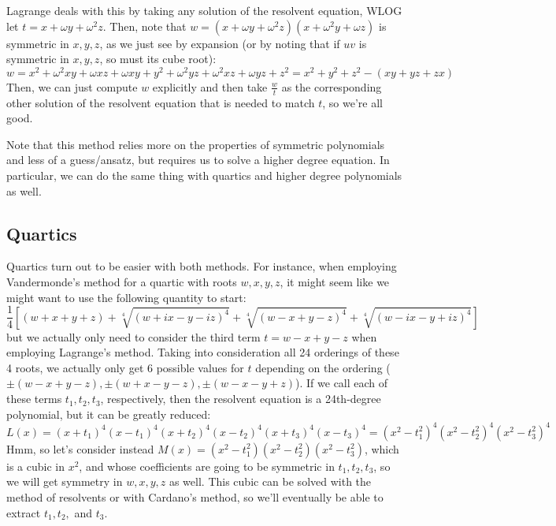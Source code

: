 \documentclass[12pt]{scrartcl}
\begin{document}
Lagrange deals with this by taking any solution of the resolvent equation, WLOG let $t = x + \omega y + \omega^2 z$. Then, note that $w = (x + \omega y + \omega^2 z)(x + \omega^2 y + \omega z)$ is symmetric in $x, y, z$, as we just see by expansion (or by noting that if $uv$ is symmetric in $x, y, z$, so must its cube root): 
\[
    w = x^2 + \omega^2 xy + \omega xz + \omega xy + y^2 + \omega^2 yz + \omega^2 xz + \omega yz + z^2 = x^2 + y^2 + z^2 - (xy + yz + zx) 
\]
Then, we can just compute $w$ explicitly and then take $\frac w t$ as the corresponding other solution of the resolvent equation that is needed to match $t$, so we're all good. 

Note that this method relies more on the properties of symmetric polynomials and less of a guess/ansatz, but requires us to solve a higher degree equation. In particular, we can do the same thing with quartics and higher degree polynomials as well. 

\subsection{Quartics}
Quartics turn out to be easier with both methods. For instance, when employing Vandermonde's method for a quartic with roots $w, x, y, z$, it might seem like we might want to use the following quantity to start: 
\[
    \frac 14 [(w + x + y + z) + \sqrt[4]{(w + ix - y - iz)^4} + \sqrt[4]{(w - x + y - z)^4} + \sqrt[4]{(w - ix - y + iz)^4}]
\]
but we actually only need to consider the third term $t = w - x + y - z$ when employing Lagrange's method. Taking into consideration all 24 orderings of these 4 roots, we actually only get 6 possible values for $t$ depending on the ordering ($\pm (w - x + y - z), \pm (w + x - y - z), \pm (w - x - y + z)$). If we call each of these terms $t_1, t_2, t_3$, respectively, then the resolvent equation is a 24th-degree polynomial, but it can be greatly reduced: 
\[
    L(x) = (x + t_1)^4 (x - t_1)^4 (x + t_2)^4 (x - t_2)^4 (x + t_3)^4 (x - t_3)^4 = (x^2 - t_1^2)^4 (x^2 - t_2^2)^4 (x^2 - t_3^2)^4 
\]  
Hmm, so let's consider instead $M(x) = (x^2 - t_1^2) (x^2 - t_2^2)(x^2 - t_3^2)$, which is a cubic in $x^2$, and whose coefficients are going to be symmetric in $t_1, t_2, t_3$, so we will get symmetry in $w, x, y, z$ as well. This cubic can be solved with the method of resolvents or with Cardano's method, so we'll eventually be able to extract $t_1, t_2,$ and $t_3$. 
\end{document}
